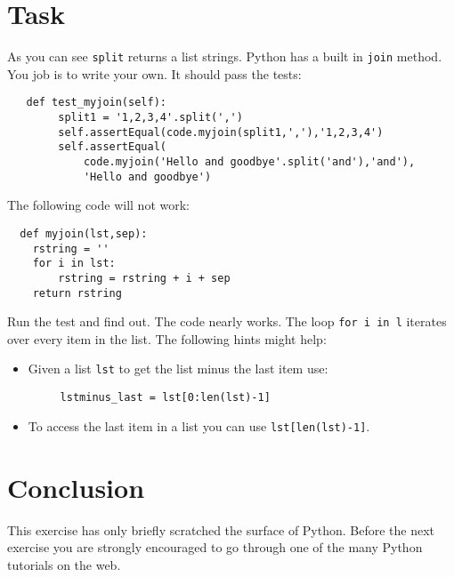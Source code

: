 \documentclass{paper}
\begin{document}
\section{Task}
As you can see {\tt split} returns a list strings. Python has a built
in {\tt join} method. You job is to write your own. It should pass the
tests:
\begin{lstlisting}
   def test_myjoin(self):
        split1 = '1,2,3,4'.split(',')
        self.assertEqual(code.myjoin(split1,','),'1,2,3,4')
        self.assertEqual(
            code.myjoin('Hello and goodbye'.split('and'),'and'),
            'Hello and goodbye')
\end{lstlisting}

The following code will not work:
\begin{lstlisting}
  def myjoin(lst,sep):
    rstring = '' 
    for i in lst:
        rstring = rstring + i + sep
    return rstring
\end{lstlisting}
Run the test and find out. The code nearly works. The loop {\tt for i in l}
iterates over every item in the list. The following hints might help:
\begin{itemize}
\item Given a list {\tt lst} to get the list minus the last item use:
  \begin{lstlisting}
     lstminus_last = lst[0:len(lst)-1]
  \end{lstlisting}
\item To access the last item in a list you can use {\tt lst[len(lst)-1]}.
\end{itemize}


\section*{Conclusion}
This exercise has only briefly scratched the surface of Python. Before
the next exercise 
you are strongly encouraged to go through one of the many Python tutorials on
the web.
\end{document}
